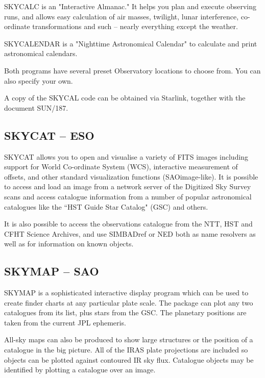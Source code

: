 \documentclass[twoside,11pt]{article}
\newcommand{\htmladdnormallink}[2]{#1}
\newcommand{\xref}[3]{#1}
\newcommand{\xlabel}[1]{}
\newcommand{\SUNSKYref}{\xref{SUN/187}{sun187}{}}
\newcommand{\SKYCATref}{\htmladdnormallink{SKYCAT}{http://arch-http.hq.eso.org/skycat/}}
\newcommand{\GSCref}{\htmladdnormallink{GSC}{http://www-gsss.stsci.edu/casbhome.html}}
\newcommand{\NEDref}{\htmladdnormallink{NED}{http://ds.internic.net/cgi-bin/enthtml/database/ned.b}}
\begin{document}
SKYCALC is an "Interactive Almanac." It helps you plan and execute observing
runs, and allows easy calculation of air masses, twilight, lunar interference,
co-ordinate transformations and such -- nearly everything except the weather.

SKYCALENDAR is a "Nighttime Astronomical Calendar" to calculate and
print astronomical calendars.

Both programs have several preset Observatory locations to choose from.
You can also specify your own.

A copy of the SKYCAL code can be obtained via Starlink, together with the
document {\SUNSKYref}.

\subsection{{\SKYCATref} -- ESO}  \xlabel{SKYCAT}
\label{sec:skycat}

{\SKYCATref} allows you to open and visualise a variety of FITS images including
support for World Co-ordinate System (WCS), interactive measurement of offsets,
and other standard visualization functions (SAOimage-like). It is possible to
access and load an image from a network server of the Digitized Sky Survey
scans and access catalogue information from a number of popular astronomical
catalogues like the ``HST Guide Star Catalog" (GSC) and others.

It is also possible to access the observations catalogue from the NTT, HST and
CFHT Science Archives, and use {SIMBADref} or {\NEDref} both as name resolvers as well as
for information on known objects.


\subsection{SKYMAP -- SAO} \xlabel{SKYMAPSAO}
\label{sec:skymapsao}

SKYMAP is a sophisticated interactive display program which can be used to
create finder charts at any particular plate scale.
The package can plot any
two catalogues from its list, plus stars from the {\GSCref}. The planetary positions
are taken from the current JPL ephemeris.

All-sky maps can also be produced to show large structures or
the position of a catalogue in the big picture. All of the IRAS plate projections
 are included so objects can be plotted
against contoured IR sky flux. Catalogue objects may be identified by
plotting a catalogue over an image.
\end{document}

